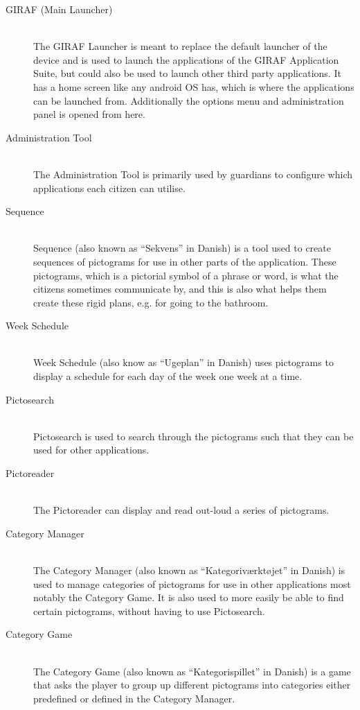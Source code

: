 \begin{description}
	\item[GIRAF (Main Launcher)]\hfill \\
	The GIRAF Launcher is meant to replace the default launcher of the device and is used to launch the applications of the GIRAF Application Suite, but could also be used to launch other third party applications.
	It has a home screen like any android OS has, which is where the applications can be launched from.
	Additionally the options menu and administration panel is opened from here.
	\item[Administration Tool]\hfill \\
	The Administration Tool is primarily used by guardians to configure which applications each citizen can utilise.
	\item[Sequence] \hfill \\
	Sequence (also known as \enquote{Sekvens} in Danish) is a tool used to create sequences of pictograms for use in other parts of the application.
	These pictograms, which is a pictorial symbol of a phrase or word, is what the citizens sometimes communicate by, and this is also what helps them create these rigid plans, e.g. for going to the bathroom.
	\item[Week Schedule] \hfill \\
	Week Schedule (also know as \enquote{Ugeplan} in Danish) uses pictograms to display a schedule for each day of the week one week at a time.
	\item[Pictosearch] \hfill \\
	Pictosearch is used to search through the pictograms such that they can be used for other applications.
	\item[Pictoreader] \hfill \\
	The Pictoreader can display and read out-loud a series of pictograms.
	\item[Category Manager] \hfill \\
	The Category Manager (also known as \enquote{Kategoriværktøjet} in Danish) is used to manage categories of pictograms for use in other applications most notably the Category Game.
	It is also used to more easily be able to find certain pictograms, without having to use Pictosearch.
	\item[Category Game] \hfill \\
	The Category Game (also known as \enquote{Kategorispillet} in Danish) is a game that asks the player to group up different pictograms into categories either predefined or defined in the Category Manager.

\end{description}
